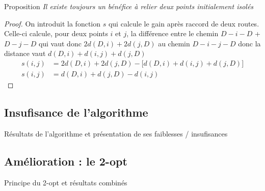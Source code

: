 \documentclass[10pt]{beamer}
\begin{document}
	\begin{frame}	
		\begin{beamerboxesrounded}[upper=prop_up,lower=prop_low,shadow=true]{Proposition}
			\textit{Il existe toujours un bénéfice à relier deux points initialement isolés}
		\end{beamerboxesrounded}
		\begin{proof}
			On introduit la fonction $s$ qui calcule le gain après raccord de deux routes. Celle-ci calcule, pour deux points $i$ et $j$, la différence entre le chemin $D-i-D$ + $D-j-D$ qui vaut donc $2d(D,i) + 2d(j,D)$ au chemin $D-i-j-D$ donc la distance vaut $d(D,i) + d(i,j) + d(j,D)$
		\begin{align*}
			s(i,j) &= 2d(D,i) + 2d(j,D) - \lbrack d(D,i) + d(i,j) + d(j,D)\rbrack \\
			s(i,j) &= d(D,i) + d(j,D) - d(i,j)
		\end{align*}		
		\end{proof}
	\end{frame}

	\subsection{Insufisance de l'algorithme}

	\begin{frame}
		Résultats de l'algorithme et présentation de ses faiblesses / insufisances
	\end{frame}

	\subsection{Amélioration : le 2-opt}

	\begin{frame}
		Principe du 2-opt et résultats combinés
	\end{frame}
\end{document}
